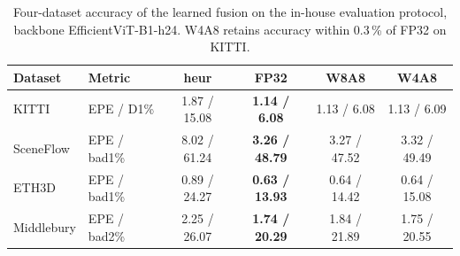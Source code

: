 \begin{table}[t]
\caption{Four-dataset accuracy of the learned fusion on the in-house evaluation
         protocol, backbone EfficientViT-B1-h24. W4A8 retains accuracy within
         0.3\,\% of FP32 on KITTI.}
\label{tab:cal2}
\centering
\setlength{\tabcolsep}{2pt}
\scriptsize
\begin{tabular}{|l|l|c|c|c|c|}
\hline
\textbf{Dataset} & \textbf{Metric} & \textbf{heur} & \textbf{FP32} & \textbf{W8A8} & \textbf{W4A8} \\
\hline
KITTI       & EPE / D1\%     & 1.87 / 15.08 & \textbf{1.14 / 6.08}  & 1.13 / 6.08 & 1.13 / 6.09 \\
SceneFlow   & EPE / bad1\%   & 8.02 / 61.24 & \textbf{3.26 / 48.79} & 3.27 / 47.52 & 3.32 / 49.49 \\
ETH3D       & EPE / bad1\%   & 0.89 / 24.27 & \textbf{0.63 / 13.93} & 0.64 / 14.42 & 0.64 / 15.08 \\
Middlebury  & EPE / bad2\%   & 2.25 / 26.07 & \textbf{1.74 / 20.29} & 1.84 / 21.89 & 1.75 / 20.55 \\
\hline
\end{tabular}
\end{table}
